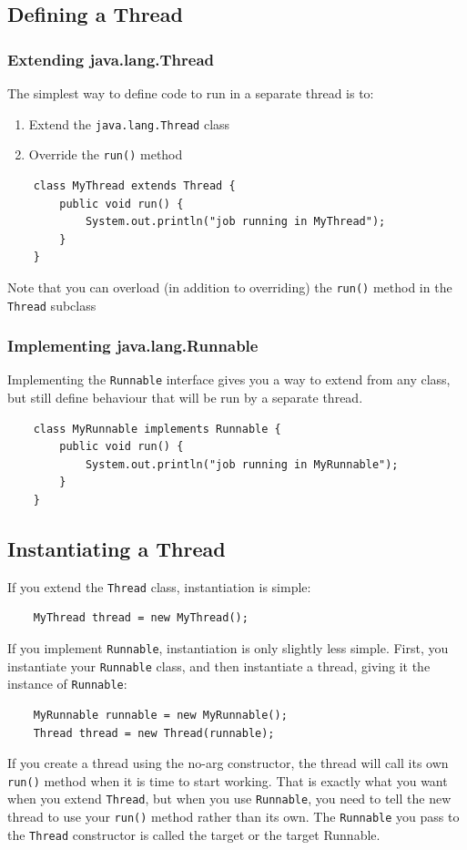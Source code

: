 \subsection{Defining a Thread}
\subsubsection{Extending java.lang.Thread}
The simplest way to define code to run in a separate thread is to:
\begin{enumerate}
    \item Extend the \verb#java.lang.Thread# class
    \item Override the \verb#run()# method
\end{enumerate}
\begin{verbatim}
    class MyThread extends Thread {
        public void run() {
            System.out.println("job running in MyThread");
        }
    }
\end{verbatim}
Note that you can overload (in addition to overriding) the \verb#run()# method in the \verb#Thread# subclass

\subsubsection{Implementing java.lang.Runnable}
Implementing the \verb#Runnable# interface gives you a way to extend from any class, but still define behaviour that will be run by a separate thread.
\begin{verbatim}
    class MyRunnable implements Runnable {
        public void run() {
            System.out.println("job running in MyRunnable");
        }
    }
\end{verbatim}

\subsection{Instantiating a Thread}
If you extend the \verb#Thread# class, instantiation is simple:
\begin{verbatim}
    MyThread thread = new MyThread();
\end{verbatim}
If you implement \verb#Runnable#, instantiation is only slightly less simple. First, you instantiate your \verb#Runnable# class, and then instantiate a thread, giving it the instance of \verb#Runnable#:
\begin{verbatim}
    MyRunnable runnable = new MyRunnable();
    Thread thread = new Thread(runnable);
\end{verbatim}
If you create a thread using the no-arg constructor, the thread will call its own \verb#run()# method when it is time to start working. That is exactly what you want when you extend \verb#Thread#, but when you use \verb#Runnable#, you need to tell the new thread to use your \verb#run()# method rather than its own. The \verb#Runnable# you pass to the \verb#Thread# constructor is called the target or the target Runnable.

